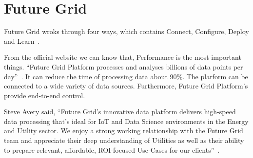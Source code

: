 \section{Future Grid}

Future Grid wroks through four ways, which contains Connect,
Configure, Deploy and Learn~\cite{www-futuregrid}.


From the official website we can know that, Performance is the 
most important things. ``Future Grid Platform processes and analyses
billions of data points per day''~\cite{www-futuregrid}. It can 
reduce the time of processing data about 90\%. The plarform can be 
connected to a wide variety of data sources. Furthermore, Future 
Grid Platform's provide end-to-end control.


Steve Avery said, ``Future Grid’s innovative data platform delivers
high-speed data processing that’s ideal for IoT and Data Science 
environments in the Energy and Utility sector. We enjoy a strong 
working relationship with the Future Grid team and appreciate their 
deep understanding of Utilities as well as their ability to prepare 
relevant, affordable, ROI-focused Use-Cases for our clients''~\cite{www-futuregrid}. 


